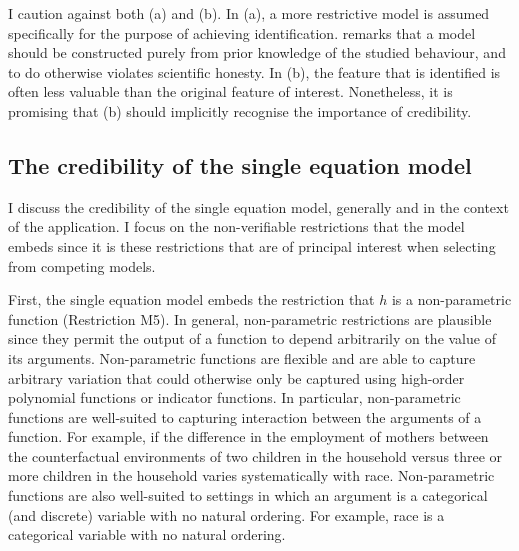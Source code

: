 \documentclass[12pt,a4paper,twoside]{article}
\newcommand\independent{\protect\mathpalette{\protect\independenT}{\perp}}
\def\independenT#1#2{\mathrel{\rlap{$#1#2$}\mkern2mu{#1#2}}}
\numberwithin{equation}{section}
\begin{document}
I caution against both (a) and (b). In (a), a more restrictive model is assumed specifically for the purpose of achieving identification. \cite{krE50} remarks that a model should be constructed purely from prior knowledge of the studied behaviour, and to do otherwise violates scientific honesty. In (b), the feature that is identified is often less valuable than the original feature of interest. Nonetheless, it is promising that (b) should implicitly recognise the importance of credibility.
\subsection{The credibility of the single equation model}
I discuss the credibility of the single equation model, generally and in the context of the application. I focus on the non-verifiable restrictions that the model embeds since it is these restrictions that are of principal interest when selecting from competing models.

First, the single equation model embeds the restriction that $h$ is a non-parametric function (Restriction M5). In general, non-parametric restrictions are plausible since they permit the output of a function to depend arbitrarily on the value of its arguments. Non-parametric functions are flexible and are able to capture arbitrary variation that could otherwise only be captured using high-order polynomial functions or indicator functions. In particular, non-parametric functions are well-suited to capturing interaction between the arguments of a function. For example, if the difference in the employment of mothers between the counterfactual environments of two children in the household versus three or more children in the household varies systematically with race. Non-parametric functions are also well-suited to settings in which an argument is a categorical (and discrete) variable with no natural ordering. For example, race is a categorical variable with no natural ordering. 
\end{document}
